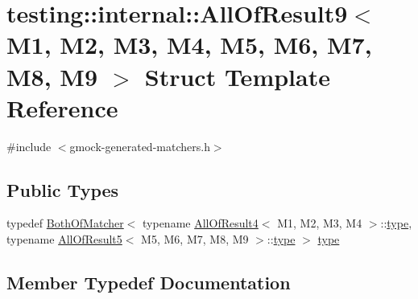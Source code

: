\hypertarget{structtesting_1_1internal_1_1_all_of_result9}{}\section{testing\+:\+:internal\+:\+:All\+Of\+Result9$<$ M1, M2, M3, M4, M5, M6, M7, M8, M9 $>$ Struct Template Reference}
\label{structtesting_1_1internal_1_1_all_of_result9}


{\ttfamily \#include $<$gmock-\/generated-\/matchers.\+h$>$}

\subsection*{Public Types}
\begin{DoxyCompactItemize}
\item 
typedef \hyperlink{classtesting_1_1internal_1_1_both_of_matcher}{Both\+Of\+Matcher}$<$ typename \hyperlink{structtesting_1_1internal_1_1_all_of_result4}{All\+Of\+Result4}$<$ M1, M2, M3, M4 $>$\+::\hyperlink{structtesting_1_1internal_1_1_all_of_result9_ade56e18d2e0b745968b87fc394710edc}{type}, typename \hyperlink{structtesting_1_1internal_1_1_all_of_result5}{All\+Of\+Result5}$<$ M5, M6, M7, M8, M9 $>$\+::\hyperlink{structtesting_1_1internal_1_1_all_of_result9_ade56e18d2e0b745968b87fc394710edc}{type} $>$ \hyperlink{structtesting_1_1internal_1_1_all_of_result9_ade56e18d2e0b745968b87fc394710edc}{type}
\end{DoxyCompactItemize}


\subsection{Member Typedef Documentation}
\mbox{\label{structtesting_1_1internal_1_1_all_of_result9_ade56e18d2e0b745968b87fc394710edc}} 
